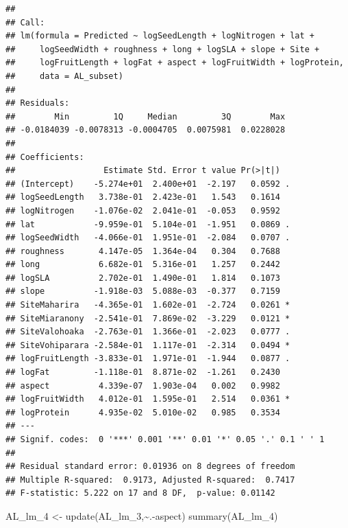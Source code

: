 \documentclass[
  12pt,
]{article}
\newenvironment{Shaded}{\begin{snugshade}}{\end{snugshade}}
\newcommand{\FunctionTok}[1]{\textcolor[rgb]{0.00,0.00,0.00}{#1}}
\newcommand{\NormalTok}[1]{#1}
\newcommand{\OtherTok}[1]{\textcolor[rgb]{0.56,0.35,0.01}{#1}}
\newcommand{\SpecialCharTok}[1]{\textcolor[rgb]{0.00,0.00,0.00}{#1}}
\begin{document}
\begin{verbatim}
## 
## Call:
## lm(formula = Predicted ~ logSeedLength + logNitrogen + lat + 
##     logSeedWidth + roughness + long + logSLA + slope + Site + 
##     logFruitLength + logFat + aspect + logFruitWidth + logProtein, 
##     data = AL_subset)
## 
## Residuals:
##        Min         1Q     Median         3Q        Max 
## -0.0184039 -0.0078313 -0.0004705  0.0075981  0.0228028 
## 
## Coefficients:
##                  Estimate Std. Error t value Pr(>|t|)  
## (Intercept)    -5.274e+01  2.400e+01  -2.197   0.0592 .
## logSeedLength   3.738e-01  2.423e-01   1.543   0.1614  
## logNitrogen    -1.076e-02  2.041e-01  -0.053   0.9592  
## lat            -9.959e-01  5.104e-01  -1.951   0.0869 .
## logSeedWidth   -4.066e-01  1.951e-01  -2.084   0.0707 .
## roughness       4.147e-05  1.364e-04   0.304   0.7688  
## long            6.682e-01  5.316e-01   1.257   0.2442  
## logSLA          2.702e-01  1.490e-01   1.814   0.1073  
## slope          -1.918e-03  5.088e-03  -0.377   0.7159  
## SiteMaharira   -4.365e-01  1.602e-01  -2.724   0.0261 *
## SiteMiaranony  -2.541e-01  7.869e-02  -3.229   0.0121 *
## SiteValohoaka  -2.763e-01  1.366e-01  -2.023   0.0777 .
## SiteVohiparara -2.584e-01  1.117e-01  -2.314   0.0494 *
## logFruitLength -3.833e-01  1.971e-01  -1.944   0.0877 .
## logFat         -1.118e-01  8.871e-02  -1.261   0.2430  
## aspect          4.339e-07  1.903e-04   0.002   0.9982  
## logFruitWidth   4.012e-01  1.595e-01   2.514   0.0361 *
## logProtein      4.935e-02  5.010e-02   0.985   0.3534  
## ---
## Signif. codes:  0 '***' 0.001 '**' 0.01 '*' 0.05 '.' 0.1 ' ' 1
## 
## Residual standard error: 0.01936 on 8 degrees of freedom
## Multiple R-squared:  0.9173, Adjusted R-squared:  0.7417 
## F-statistic: 5.222 on 17 and 8 DF,  p-value: 0.01142
\end{verbatim}

\begin{Shaded}
\begin{Highlighting}[]
\NormalTok{AL\_lm\_4 }\OtherTok{\textless{}{-}} \FunctionTok{update}\NormalTok{(AL\_lm\_3,}\SpecialCharTok{\textasciitilde{}}\NormalTok{.}\SpecialCharTok{{-}}\NormalTok{aspect)}
\FunctionTok{summary}\NormalTok{(AL\_lm\_4)}
\end{Highlighting}
\end{Shaded}
\end{document}
